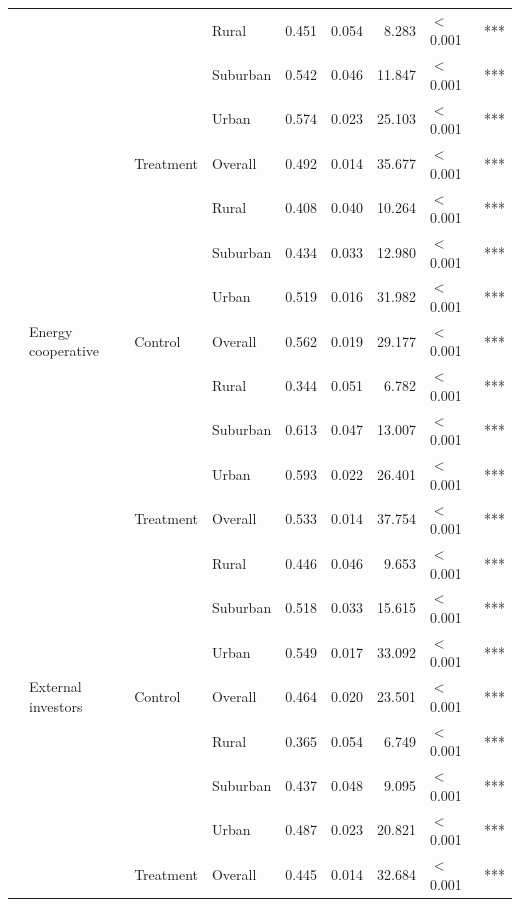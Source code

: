 \begin{longtable}[t]{>{\raggedright\arraybackslash}t{4cm}>{\raggedright\arraybackslash}t{4cm}>{\raggedright\arraybackslash}t{2.5cm}lrrrll}
\nopagebreak
 &  &  & Rural & 0.451 & 0.054 & 8.283 & $<$0.001 & ***\\
\nopagebreak
 &  &  & Suburban & 0.542 & 0.046 & 11.847 & $<$0.001 & ***\\
\nopagebreak
 &  &  & Urban & 0.574 & 0.023 & 25.103 & $<$0.001 & ***\\
\nopagebreak
 &  & Treatment & Overall & 0.492 & 0.014 & 35.677 & $<$0.001 & ***\\
\nopagebreak
 &  &  & Rural & 0.408 & 0.040 & 10.264 & $<$0.001 & ***\\
\nopagebreak
 &  &  & Suburban & 0.434 & 0.033 & 12.980 & $<$0.001 & ***\\
\nopagebreak
 &  &  & Urban & 0.519 & 0.016 & 31.982 & $<$0.001 & ***\\
\nopagebreak
 & Energy cooperative & Control & Overall & 0.562 & 0.019 & 29.177 & $<$0.001 & ***\\
\nopagebreak
 &  &  & Rural & 0.344 & 0.051 & 6.782 & $<$0.001 & ***\\
\nopagebreak
 &  &  & Suburban & 0.613 & 0.047 & 13.007 & $<$0.001 & ***\\
\nopagebreak
 &  &  & Urban & 0.593 & 0.022 & 26.401 & $<$0.001 & ***\\
\nopagebreak
 &  & Treatment & Overall & 0.533 & 0.014 & 37.754 & $<$0.001 & ***\\
\nopagebreak
 &  &  & Rural & 0.446 & 0.046 & 9.653 & $<$0.001 & ***\\
\nopagebreak
 &  &  & Suburban & 0.518 & 0.033 & 15.615 & $<$0.001 & ***\\
\nopagebreak
 &  &  & Urban & 0.549 & 0.017 & 33.092 & $<$0.001 & ***\\
\nopagebreak
 & External investors & Control & Overall & 0.464 & 0.020 & 23.501 & $<$0.001 & ***\\
\nopagebreak
 &  &  & Rural & 0.365 & 0.054 & 6.749 & $<$0.001 & ***\\
\nopagebreak
 &  &  & Suburban & 0.437 & 0.048 & 9.095 & $<$0.001 & ***\\
\nopagebreak
 &  &  & Urban & 0.487 & 0.023 & 20.821 & $<$0.001 & ***\\
\nopagebreak
 &  & Treatment & Overall & 0.445 & 0.014 & 32.684 & $<$0.001 & ***\\

\end{longtable}
